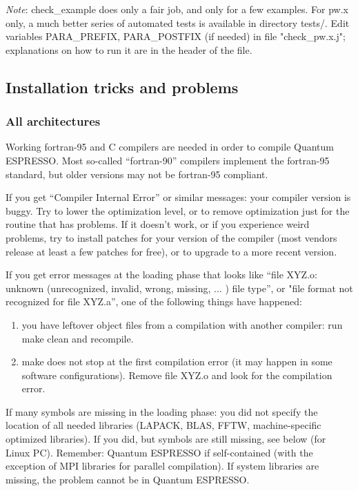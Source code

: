\documentclass[12pt,a4paper]{article}
\begin{document}
{\em Note}: check\_example does only a fair job, and only for a few examples. 
For pw.x only, a much better series of automated tests is available in
directory tests/. Edit variables PARA\_PREFIX, PARA\_POSTFIX (if
needed) in file "check\_pw.x.j"; explanations on how to run it 
are in the header of the file.

\subsection{Installation tricks and problems}

\subsubsection{All architectures}

Working fortran-95 and C compilers are needed in order
to compile Quantum ESPRESSO. Most so-called “fortran-90” compilers
implement the fortran-95 standard, but older versions may not be
fortran-95 compliant.
    
If you get “Compiler Internal Error” or similar messages: your
compiler version is buggy. Try to lower the optimization level, or to
remove optimization just for the routine that has problems. If it
doesn't work, or if you experience weird problems, try to 
install patches for your version of the compiler (most vendors release
at least a few patches for free), or to upgrade to a more recent version.
    
If you get error messages at the loading phase that looks like 
“file XYZ.o: unknown (unrecognized, invalid, wrong, missing, ... ) file
type”, or  "file format not recognized for file XYZ.a”, one of
the following things have happened:
\begin{enumerate}
\item you have leftover object files from a compilation with another
  compiler: run make clean and recompile. 
\item make does not stop at the first compilation error (it may happen
  in some software configurations). Remove file XYZ.o and look for the
  compilation  error. 
\end{enumerate}
If many symbols are missing in the loading phase: you did not specify the
location of all needed libraries (LAPACK, BLAS, FFTW, machine-specific
optimized libraries). If you did, but symbols are still missing, see below (for
Linux PC). Remember: Quantum ESPRESSO if self-contained (with the exception of
MPI libraries for parallel compilation). If system libraries are missing, the
problem cannot be in Quantum ESPRESSO.
\end{document}
